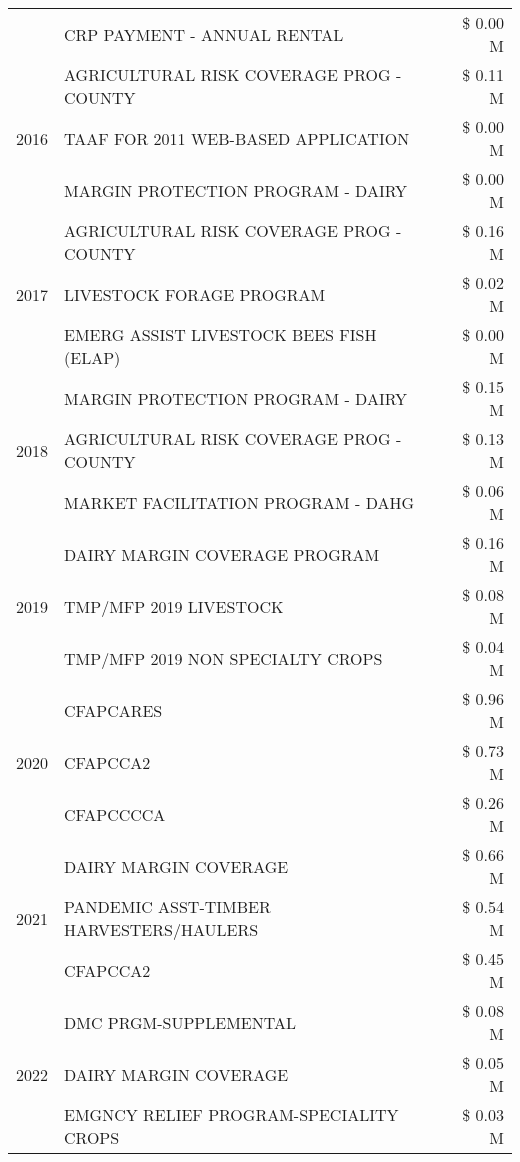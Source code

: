 \begin{tabular}{llr}
 & CRP PAYMENT - ANNUAL RENTAL & \$ 0.00 M \\
\cline{1-3}
\multirow[t]{3}{*}{2016} & AGRICULTURAL RISK COVERAGE PROG - COUNTY & \$ 0.11 M \\
 & TAAF FOR 2011 WEB-BASED APPLICATION & \$ 0.00 M \\
 & MARGIN PROTECTION PROGRAM - DAIRY & \$ 0.00 M \\
\cline{1-3}
\multirow[t]{3}{*}{2017} & AGRICULTURAL RISK COVERAGE PROG - COUNTY & \$ 0.16 M \\
 & LIVESTOCK FORAGE PROGRAM & \$ 0.02 M \\
 & EMERG ASSIST LIVESTOCK BEES FISH (ELAP) & \$ 0.00 M \\
\cline{1-3}
\multirow[t]{3}{*}{2018} & MARGIN PROTECTION PROGRAM - DAIRY & \$ 0.15 M \\
 & AGRICULTURAL RISK COVERAGE PROG - COUNTY & \$ 0.13 M \\
 & MARKET FACILITATION PROGRAM - DAHG & \$ 0.06 M \\
\cline{1-3}
\multirow[t]{3}{*}{2019} & DAIRY MARGIN COVERAGE PROGRAM & \$ 0.16 M \\
 & TMP/MFP 2019 LIVESTOCK & \$ 0.08 M \\
 & TMP/MFP 2019 NON SPECIALTY CROPS & \$ 0.04 M \\
\cline{1-3}
\multirow[t]{3}{*}{2020} & CFAPCARES & \$ 0.96 M \\
 & CFAPCCA2 & \$ 0.73 M \\
 & CFAPCCCCA & \$ 0.26 M \\
\cline{1-3}
\multirow[t]{3}{*}{2021} & DAIRY MARGIN COVERAGE & \$ 0.66 M \\
 & PANDEMIC ASST-TIMBER HARVESTERS/HAULERS & \$ 0.54 M \\
 & CFAPCCA2 & \$ 0.45 M \\
\cline{1-3}
\multirow[t]{3}{*}{2022} & DMC PRGM-SUPPLEMENTAL & \$ 0.08 M \\
 & DAIRY MARGIN COVERAGE & \$ 0.05 M \\
 & EMGNCY RELIEF PROGRAM-SPECIALITY CROPS & \$ 0.03 M \\
\cline{1-3}
\bottomrule
\end{tabular}
